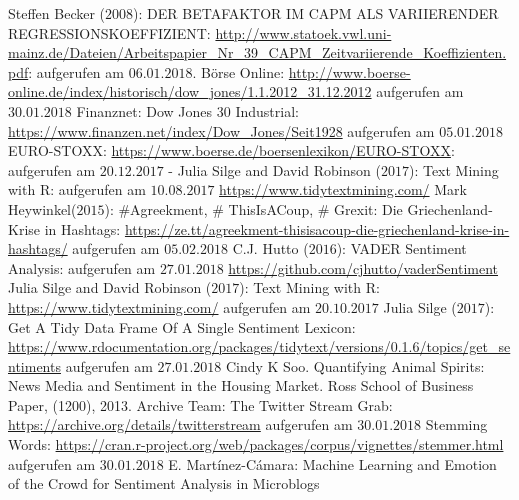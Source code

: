 
	\newpage
	\begin{thebibliography}{12345678}	
	 Steffen Becker ($2008$): DER BETAFAKTOR IM CAPM ALS VARIIERENDER REGRESSIONSKOEFFIZIENT: \url{http://www.statoek.vwl.uni-mainz.de/Dateien/Arbeitspapier_Nr_39_CAPM_Zeitvariierende_Koeffizienten.pdf}: aufgerufen am $06.01.2018$.
	 Börse Online: \url{http://www.boerse-online.de/index/historisch/dow_jones/1.1.2012_31.12.2012} aufgerufen am $30.01.2018$
	 Finanznet: Dow Jones 30 Industrial: \url{https://www.finanzen.net/index/Dow_Jones/Seit1928} aufgerufen am $05.01.2018$	
	 EURO-STOXX: \url{https://www.boerse.de/boersenlexikon/EURO-STOXX}: aufgerufen am $20.12.2017$	
	-	Julia Silge and David Robinson ($2017$): Text Mining with R: aufgerufen am $10.08.2017$ \url{https://www.tidytextmining.com/}
	 Mark Heywinkel($2015$): \#Agreekment, \# ThisIsACoup, \# Grexit: Die Griechenland-Krise in Hashtags: \url{https://ze.tt/agreekment-thisisacoup-die-griechenland-krise-in-hashtags/}
	aufgerufen am $05.02.2018$ 
	 C.J. Hutto ($2016$): VADER Sentiment Analysis: aufgerufen am $27.01.2018$ \url{https://github.com/cjhutto/vaderSentiment}
	 Julia Silge and David Robinson ($2017$):  Text Mining with R: \url{https://www.tidytextmining.com/} aufgerufen am $20.10.2017$ 
	 Julia Silge ($2017$): Get A Tidy Data Frame Of A Single Sentiment Lexicon: \url{https://www.rdocumentation.org/packages/tidytext/versions/0.1.6/topics/get_sentiments} aufgerufen am $27.01.2018$ 
	 Cindy K Soo. Quantifying Animal Spirits: News Media and Sentiment in the Housing Market. Ross School of Business Paper, (1200), 2013.
	Archive Team: The Twitter Stream Grab:
	 \url{https://archive.org/details/twitterstream} aufgerufen am $30.01.2018$
	 Stemming Words: \url{https://cran.r-project.org/web/packages/corpus/vignettes/stemmer.html} aufgerufen am $30.01.2018$
   E. Martínez-Cámara: Machine Learning and Emotion of the Crowd for Sentiment Analysis in Microblogs
\end{thebibliography}
\clearpage